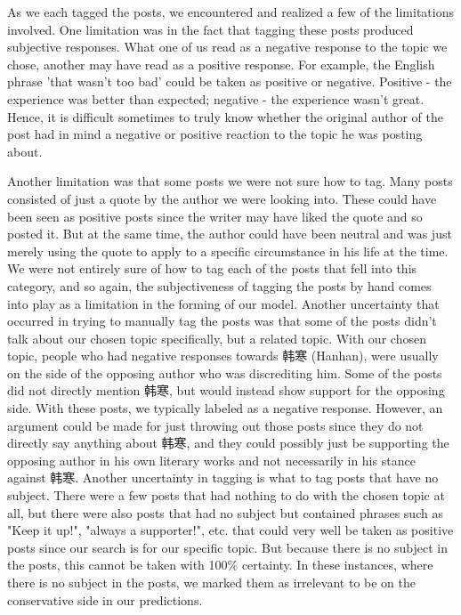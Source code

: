 \documentclass[11pt]{article}
\newcommand{\1}[1]{{\mathbf 1}\left\{#1\right\}}        %
\begin{document}
As we each tagged the posts, we encountered and realized a few of the limitations involved. One limitation was in the fact that tagging these posts produced subjective responses.  What one of us read as a negative response to the topic we chose, another may have read as a positive response.  For example, the English phrase 'that wasn't too bad' could be taken as positive or negative.  Positive - the experience was better than expected; negative - the experience wasn't great. Hence, it is difficult sometimes to truly know whether the original author of the post had in mind a negative or positive reaction to the topic he was posting about.  

Another limitation was that some posts we were not sure how to tag. Many posts consisted of just a quote by the author we were looking into.  These could have been seen as positive posts since the writer may have liked the quote and so posted it. But at the same time, the author could have been neutral and was just merely using the quote to apply to a specific circumstance in his life at the time. We were not entirely sure of how to tag each of the posts that fell into this category, and so again, the subjectiveness of tagging the posts by hand comes into play as a limitation in the forming of our model.  Another uncertainty that occurred in trying to manually tag the posts was that some of the posts didn't talk about our chosen topic specifically, but a related topic.  With our chosen topic, people who had negative responses towards 韩寒 (Hanhan), were usually on the side of the opposing author who was discrediting him.  Some of the posts did not directly mention 韩寒, but would instead show support for the opposing side. With these posts, we typically labeled as a negative response.  However, an argument could be made for just throwing out those posts since they do not directly say anything about 韩寒, and they could possibly just be supporting the opposing author in his own literary works and not necessarily in his stance against 韩寒.  Another uncertainty in tagging is what to tag posts that have no subject.  There were a few posts that had nothing to do with the chosen topic at all, but there were also posts that had no subject but contained phrases such as "Keep it up!", "always a supporter!", etc. that could very well be taken as positive posts since our search is for our specific topic. But because there is no subject in the posts, this cannot be taken with 100\% certainty. In these instances, where there is no subject in the posts, we marked them as irrelevant to be on the conservative side in our predictions. 
\end{document}
